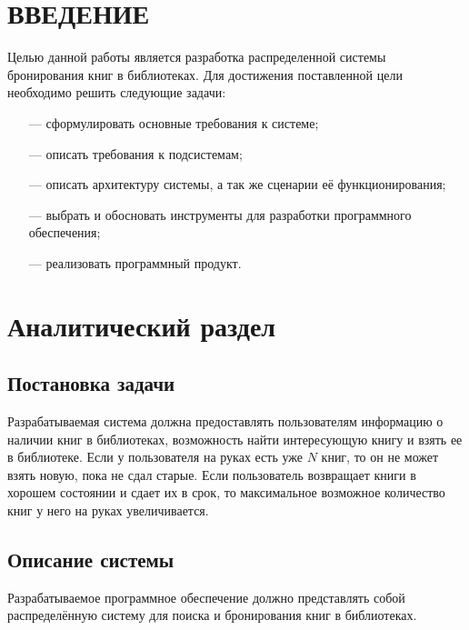 \documentclass[a4paper, 12pt]{article}
\begin{document}
\begin{large}
\def\contentsname{СОДЕРЖАНИЕ}
\tableofcontents

\newpage
\section*{ВВЕДЕНИЕ}
Целью данной работы является разработка распределенной системы бронирования книг в библиотеках. 
Для достижения поставленной цели необходимо решить следующие задачи:

\begin{itemize}
    \item[---] сформулировать основные требования к системе;
    \item[---] описать требования к подсистемам;
    \item[---] описать архитектуру системы, а так же сценарии её функционирования;
    \item[---] выбрать и обосновать инструменты для разработки программного обеспечения;
    \item[---] реализовать программный продукт.
\end{itemize}

\newpage
\titleformat{\section}[block]
{\bfseries\large\filright}{\thesection}{1em}{}
\section{Аналитический раздел}
\subsection{Постановка задачи}
Разрабатываемая система должна предоставлять пользователям информацию о наличии книг в библиотеках, возможность найти интересующую книгу и взять ее в библиотеке.
Если у пользователя на руках есть уже $N$ книг, то он не может взять новую, пока не сдал старые. 
Если пользователь возвращает книги в хорошем состоянии и сдает их в срок, то максимальное возможное количество книг у него на руках увеличивается.

\subsection{Описание системы}
Разрабатываемое программное обеспечение должно представлять собой распределённую систему для поиска и бронирования книг в библиотеках.


\end{large}
\end{document}
